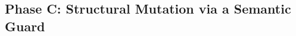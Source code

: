 %
%     
%
%

\subsection{Phase C: Structural Mutation via a Semantic Guard}
\label{sec:exp:phase-c}

